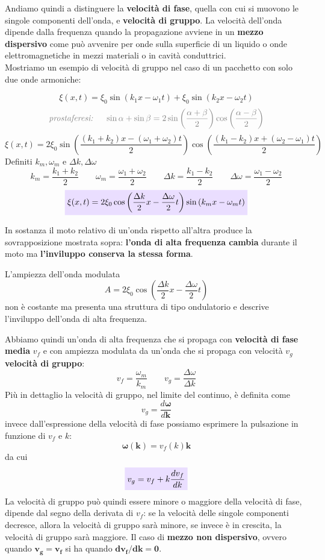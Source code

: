 \documentclass[x11names]{report}
\newcommand{\viola}[1]{\colorbox{yred}{$\displaystyle #1$}}
\begin{document}
	Andiamo quindi a distinguere la \textbf{velocità di fase}, quella con cui si muovono le singole componenti dell'onda, e \textbf{velocità di gruppo}. 
	La velocità dell'onda dipende dalla frequenza quando la propagazione avviene in un \textbf{mezzo dispersivo} come può avvenire per onde sulla superficie di un liquido o onde elettromagnetiche in mezzi materiali o in cavità conduttrici.\\
	
	\noindent
	Mostriamo un esempio di velocità di gruppo nel caso di un pacchetto con solo due onde armoniche:
	
	\[ 
	\xi(x,t) = \xi_0\sin\left(k_1x -\omega_1 t\right) + \xi_0\sin\left(k_2x -\omega_2 t\right)
	\]
	\[ 
	\textcolor{gray}{\textit{prostaferesi: } \quad \sin\alpha + \sin\beta = 2\sin\left(\frac{\alpha + \beta}{2}\right)\cos\left(\frac{\alpha - \beta}{2}\right)}
	\]
	\[ 
	\xi(x,t) = 2\xi_0\sin\left(\frac{(k_1 + k_2)x - (\omega_1 + \omega_2)t}{2}\right) \cos\left(\frac{(k_1 - k_2)x + (\omega_2 - \omega_1)t}{2}\right)
	\]
	Definiti \(k_m,\omega _m\) e \(\Delta k,\Delta\omega\)
	\[ 
	\boxed{k_m = \frac{k_1 + k_2}{2}} \qquad \boxed{\omega _m = \frac{\omega _1 + \omega _2}{2}} \qquad \boxed{\Delta k=\frac{k_1 - k_2}{2}} \qquad \boxed{\Delta \omega = \frac{\omega_1 - \omega_2}{2}}
	\]
	\[ 
	\viola{\xi(x,t) = 2\xi_0\cos\left(\frac{\Delta k}{2}x - \frac{\Delta\omega}{2}t \right)\sin\left(k_mx - \omega_mt\right)}
	\]

	
	
	In sostanza il moto relativo di un'onda rispetto all'altra produce la sovrapposizione mostrata sopra: \textbf{l'onda di alta frequenza cambia} durante il moto ma \textbf{l'inviluppo conserva la stessa forma}.
	
	L'ampiezza dell'onda modulata
	\[ 
	A = 2\xi_0\cos\left(\frac{\Delta k}{2}x - \frac{\Delta\omega}{2}t \right)
	\]
	non è costante ma presenta una struttura di tipo ondulatorio e descrive l'inviluppo dell'onda di alta frequenza.
	
	Abbiamo quindi un'onda di alta frequenza che si propaga con \textbf{velocità di fase media} \(v_f\) e con ampiezza modulata da un'onda che si propaga con velocità \(v_g\) \textbf{velocità di gruppo}:
	\[ 
	v_f = \frac{\omega _m}{k_m} \qquad v_g = \frac{\Delta \omega }{\Delta k}
	\]
	Più in dettaglio la velocità di gruppo, nel limite del continuo, è definita come 
	\[ 
	v_g = \frac{d\boldsymbol{\omega} }{d\boldsymbol{k}}
	\]
	invece dall'espressione della velocità di fase possiamo esprimere la pulsazione in funzione di \(v_f\) e \(k\):
	\[ 
	\boldsymbol{\omega (k)} = v_f(k)\boldsymbol{k}
	\]
	da cui
	\begin{equation}\label{relazione di dispersione}
		\viola{v_g = v_f + k\frac{dv_f}{dk}} 
	\end{equation}
	La velocità di gruppo può quindi essere minore o maggiore della velocità di fase, dipende dal segno della derivata di \(v_f\): se la velocità delle singole componenti decresce, allora la velocità di gruppo sarà minore, se invece è in crescita, la velocità di gruppo sarà maggiore. Il caso di \textbf{mezzo non dispersivo}, ovvero quando \(\boldsymbol{v_g = v_f}\) si ha quando \(\boldsymbol{dv_f/dk = 0}\).
	
\end{document}
